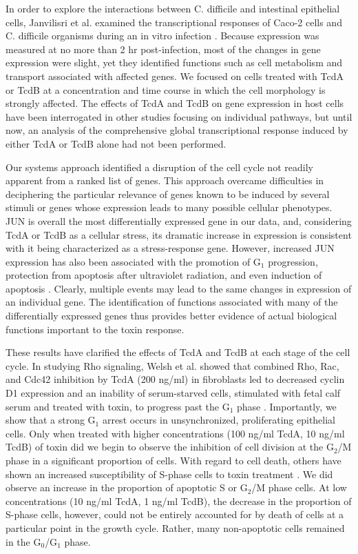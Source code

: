 In order to explore the interactions between C. difficile and intestinal epithelial cells, Janvilisri et al. examined the transcriptional responses of Caco-2 cells and C. difficile organisms during an in vitro infection \cite{Janvilisri:2010wf}. Because expression was measured at no more than 2 hr post-infection, most of the changes in gene expression were slight, yet they identified functions such as cell metabolism and transport associated with affected genes. We focused on cells treated with TcdA or TcdB at a concentration and time course in which the cell morphology is strongly affected. The effects of TcdA and TcdB on gene expression in host cells have been interrogated in other studies focusing on individual pathways, but until now, an analysis of the comprehensive global transcriptional response induced by either TcdA or TcdB alone had not been performed.

Our systems approach identified a disruption of the cell cycle not readily apparent from a ranked list of genes. This approach overcame difficulties in deciphering the particular relevance of genes known to be induced by several stimuli or genes whose expression leads to many possible cellular phenotypes. JUN is overall the most differentially expressed gene in our data, and, considering TcdA or TcdB as a cellular stress, its dramatic increase in expression is consistent with it being characterized as a stress-response gene. However, increased JUN expression has also been associated with the promotion of G$_{\text{1}}$ progression, protection from apoptosis after ultraviolet radiation, and even induction of apoptosis \cite{Ameyar:2003cc}. Clearly, multiple events may lead to the same changes in expression of an individual gene. The identification of functions associated with many of the differentially expressed genes thus provides better evidence of actual biological functions important to the toxin response. 

These results have clarified the effects of TcdA and TcdB at each stage of the cell cycle. In studying Rho signaling, Welsh et al. showed that combined Rho, Rac, and Cdc42 inhibition by TcdA (200 ng/ml) in fibroblasts led to decreased cyclin D1 expression and an inability of serum-starved cells, stimulated with fetal calf serum and treated with toxin, to progress past the G$_{\text{1}}$ phase \cite{Welsh:2001id}. Importantly, we show that a strong G$_{\text{1}}$ arrest occurs in unsynchronized, proliferating epithelial cells. Only when treated with higher concentrations (100 ng/ml TcdA, 10 ng/ml TcdB) of toxin did we begin to observe the inhibition of cell division at the G$_{\text{2}}$/M phase in a significant proportion of cells. With regard to cell death, others have shown an increased susceptibility of S-phase cells to toxin treatment \cite{Huelsenbeck:2007df}. We did observe an increase in the proportion of apoptotic S or G$_{\text{2}}$/M phase cells. At low concentrations (10 ng/ml TcdA, 1 ng/ml TcdB), the decrease in the proportion of S-phase cells, however, could not be entirely accounted for by death of cells at a particular point in the growth cycle. Rather, many non-apoptotic cells remained in the G$_{\text{0}}$/G$_{\text{1}}$ phase.

